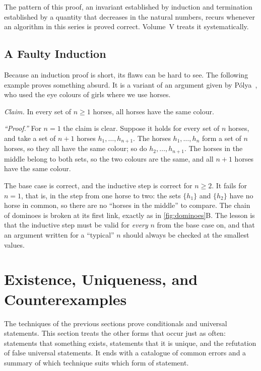 The pattern of this proof, an invariant established by induction and termination established by a quantity that decreases in the natural numbers, recurs whenever an algorithm in this series is proved correct. Volume~V treats it systematically.

\subsection{A Faulty Induction}

Because an induction proof is short, its flaws can be hard to see. The following example proves something absurd. It is a variant of an argument given by P\'olya~\cite[p.~120]{polya1954induction}, who used the eye colours of girls where we use horses.

\emph{Claim.} In every set of $n\ge1$ horses, all horses have the same colour.

\emph{``Proof.''} For $n=1$ the claim is clear. Suppose it holds for every set of $n$ horses, and take a set of $n+1$ horses $h_1,\ldots,h_{n+1}$. The horses $h_1,\ldots,h_n$ form a set of $n$ horses, so they all have the same colour; so do $h_2,\ldots,h_{n+1}$. The horses in the middle belong to both sets, so the two colours are the same, and all $n+1$ horses have the same colour.

The base case is correct, and the inductive step is correct for $n\ge2$. It fails for $n=1$, that is, in the step from one horse to two: the sets $\{h_1\}$ and $\{h_2\}$ have no horse in common, so there are no ``horses in the middle'' to compare. The chain of dominoes is broken at its first link, exactly as in \cref{fig:dominoes}B. The lesson is that the inductive step must be valid for \emph{every} $n$ from the base case on, and that an argument written for a ``typical'' $n$ should always be checked at the smallest values.

\section{Existence, Uniqueness, and Counterexamples}
\label{sec:existence}

The techniques of the previous sections prove conditionals and universal statements. This section treats the other forms that occur just as often: statements that something exists, statements that it is unique, and the refutation of false universal statements. It ends with a catalogue of common errors and a summary of which technique suits which form of statement.

